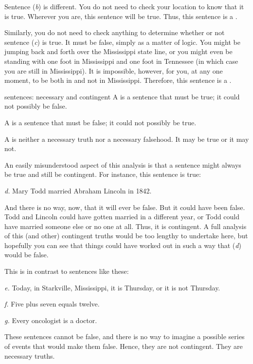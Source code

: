 Sentence (\textit{b}) is different. You do not need to check your location to know that it is true. Wherever you are, this sentence will be true. Thus, this sentence is a . 

Similarly, you do not need to check anything to determine whether or not sentence (\textit{c}) is true. It must be false, simply as a matter of logic. You might be jumping back and forth over the Mississippi state line, or you might even be standing with one foot in Mississippi and one foot in Tennessee (in which case you are still in Mississippi). It is impossible, however, for you, at any one moment, to be both in and not in Mississippi. Therefore, this sentence is a .

\begin{factboxy}{sentences: necessary and contingent}
\noindent A  is a sentence that must be true; it could not possibly be false.\medskip

\noindent A  is a sentence that must be false; it could not possibly be true.\medskip

\noindent A  is neither a necessary truth nor a necessary falsehood. It may be true or it may not.
\end{factboxy}

An easily misunderstood aspect of this analysis is that a sentence might always be true and still be contingent. For instance, this sentence is true: 
	\begin{earg}
		\item[\textit{d.}] Mary Todd married Abraham Lincoln in 1842. 
	\end{earg}
And there is no way, now, that it will ever be false. But it could have been false. Todd and Lincoln could have gotten married in a different  year, or Todd could have married someone else or no one at all. Thus, it is contingent. A full analysis of this (and other) contingent truths would be too lengthy to undertake here, but hopefully you can see that things could have worked out in such a way that (\textit{d}) would be false. 

This is in contrast to sentences like these: 
\begin{earg}
	\item[\textit{e.}] Today, in Starkville, Mississippi, it is Thursday, or it is not Thursday. 
	\item[\textit{f.}] Five plus seven equals twelve.
	\item[\textit{g.}] Every oncologist is a doctor. 
\end{earg}
These sentences cannot be false, and there is no way to imagine a possible series of events that would make them false. Hence, they are not contingent. They are necessary truths. 



